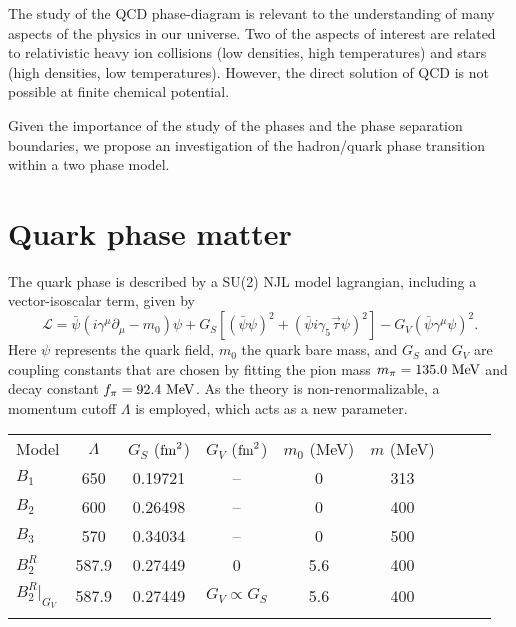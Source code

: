 \documentclass{ws-ijmpcs}
\begin{document}
The study of the QCD phase-diagram is relevant to the understanding of many aspects of the physics in our universe. Two of the aspects of interest are related to relativistic heavy ion collisions (low densities, high temperatures) and stars (high densities, low temperatures). However, the direct solution of QCD is not possible at finite chemical potential.

Given the importance of the study of the phases and the phase separation boundaries, we propose an investigation of the hadron/quark phase transition within a two phase model.

\section{Quark phase matter}

The quark phase is described by a SU(2) NJL model lagrangian, including a vector-isoscalar term, given by \cite{Buballa2005}
\begin{equation}\label{Eq:LagNJL-SU2-Bub}
	\mathcal{L} =\bar{\psi}(i\gamma^\mu\partial_\mu - m_0)\psi + G_S[(\bar{\psi}\psi)^2 + (\bar{\psi}i\gamma_5\vec{\tau}\psi)^2] - G_V(\bar{\psi}\gamma^\mu \psi)^2.
\end{equation}
%
Here $\psi$ represents the quark field, $m_0$ the quark bare mass, and $G_S$ and $G_V$ are coupling constants that are chosen by fitting the pion mass $m_\pi = 135.0~\rm{MeV}$ and decay constant $f_\pi = 92.4~\rm{MeV}$. As the theory is non-renormalizable, a momentum cutoff $\Lambda$ is employed, which acts as a new parameter.

\begin{table}[ht]
{\begin{tabular}{@{}lcccccccc@{}}\toprule
Model &  $\Lambda$ & $G_S$ ($\rm{fm}^2$) & $G_V$ ($\rm{fm}^2$) & $m_0$ (MeV) & $m$ (MeV) \\ \colrule
$B_1$ & 650 & 0.19721 & -- & 0 & 313 \\
$B_2$ & 600 & 0.26498 & -- & 0 & 400 \\
$B_3$ & 570 & 0.34034 & -- & 0 & 500 \\
$B_2^R$ & 587.9 & 0.27449 & 0 & 5.6 & 400 \\
$B_2^R|_{G_V}$ & 587.9 & 0.27449 & $G_V \propto G_S$ & 5.6 & 400\\
\botrule
\end{tabular} \label{Tab:Parametros_NJL}}
\end{table}
\end{document}
